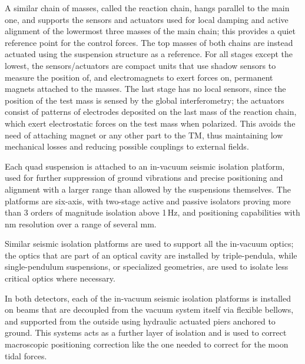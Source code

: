 A similar chain of masses, called the reaction chain, hangs parallel to the main one, 
and supports the sensors and actuators used for local damping and active alignment 
of the lowermost three masses of the main chain; this provides a quiet reference point 
for the control forces. The top masses of both chains are instead actuated using the 
suspension structure as a reference. For all stages except the lowest, the sensors/actuators 
are compact units that use shadow sensors to measure the position of, and 
electromagnets to exert forces on, permanent magnets attached to the masses. 
The last stage has no local sensors, since the position of the test mass is sensed 
by the global interferometry; the actuators consist of patterns of electrodes 
deposited on the last mass of the reaction chain, which exert electrostatic 
forces on the test mass when polarized. This avoids the need of 
attaching magnet or any other part to the TM, thus maintaining low mechanical 
losses and reducing possible couplings to external fields.

Each quad suspension is attached to an in-vacuum seismic isolation platform, 
used for further suppression of ground vibrations and precise positioning and 
alignment with a larger range than allowed by the suspensions themselves. The 
platforms are six-axis, with two-stage active and passive isolators proving more 
than 3 orders of magnitude isolation above 1\,Hz, and positioning capabilities 
with nm resolution over a range of several mm.

Similar seismic isolation platforms are used to support all the in-vacuum optics; 
the optics that are part of an optical cavity are installed by triple-pendula, while 
single-pendulum suspensions, or specialized geometries, are used to isolate 
less critical optics where necessary.

In both detectors, each of the in-vacuum seismic isolation platforms is 
installed on beams that are decoupled from the vacuum system itself via 
flexible bellows, and supported from the outside using hydraulic actuated 
piers anchored to ground. This systems acts as a further layer of isolation 
and is used to correct macroscopic positioning correction like the one needed 
to correct for the moon tidal forces.


